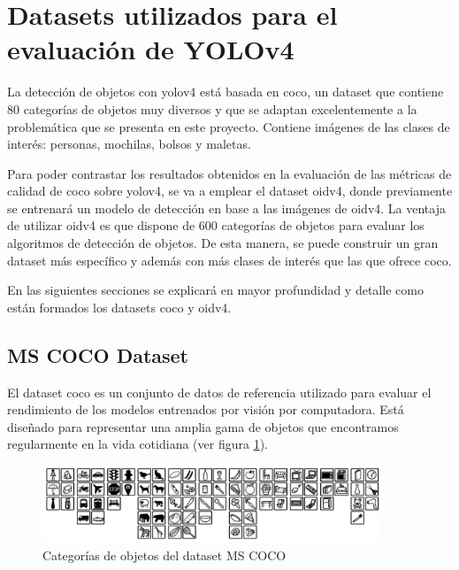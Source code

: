 \section{Datasets utilizados para el evaluación de YOLOv4}
\label{sec:datasets-utilizados}

La detección de objetos con \gls{yolov4} está basada en \gls{coco}, un dataset que contiene 80 categorías de objetos muy diversos y que se adaptan excelentemente a la problemática que se presenta en este proyecto. Contiene imágenes de las clases de interés: personas, mochilas, bolsos y maletas.

Para poder contrastar los resultados obtenidos en la evaluación de las métricas de calidad de \gls{coco} sobre \gls{yolov4}, se va a emplear el dataset \gls{oidv4}, donde previamente se entrenará un modelo de detección en base a las imágenes de \gls{oidv4}. La ventaja de utilizar \gls{oidv4} es que dispone de 600 categorías de objetos para evaluar los algoritmos de detección de objetos. De esta manera, se puede construir un gran dataset más específico y además con más clases de interés que las que ofrece \gls{coco}.

En las siguientes secciones se explicará en mayor profundidad y detalle como están formados los datasets \gls{coco} y \gls{oidv4}.

\subsection{MS COCO Dataset}
\label{subsec:coco-dataset}

El dataset \gls{coco} \cite{lin2015microsoft} es un conjunto de datos de referencia utilizado para evaluar el rendimiento de los modelos entrenados por visión por computadora. Está diseñado para representar una amplia gama de objetos que encontramos regularmente en la vida cotidiana (ver figura \ref{fig:cocodataset}).

\begin{figure}[ht]
\centering
\includegraphics[width=0.9\textwidth]{img/chapters/desarrollo/cocodataset.png}
\caption{\label{fig:cocodataset}Categorías de objetos del dataset MS COCO \cite{coco-official-website}}
\end{figure}


